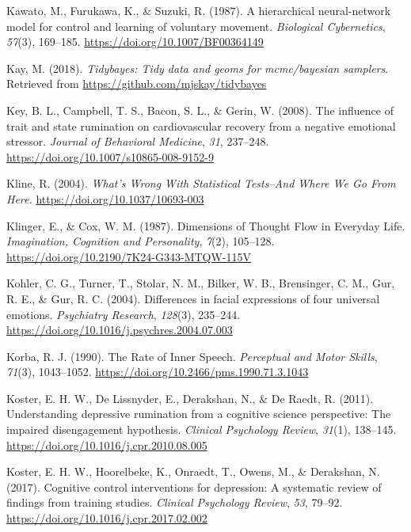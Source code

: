 \documentclass[a4paper,12pt,twoside,openright,oldfontcommands]{memoir}
\begin{document}
\leavevmode\hypertarget{ref-kawato_hierarchical_1987}{}%
Kawato, M., Furukawa, K., \& Suzuki, R. (1987). A hierarchical neural-network model for control and learning of voluntary movement. \emph{Biological Cybernetics}, \emph{57}(3), 169--185. \url{https://doi.org/10.1007/BF00364149}

\leavevmode\hypertarget{ref-R-tidybayes}{}%
Kay, M. (2018). \emph{Tidybayes: Tidy data and geoms for mcmc/bayesian samplers}. Retrieved from \url{https://github.com/mjskay/tidybayes}

\leavevmode\hypertarget{ref-Key2008}{}%
Key, B. L., Campbell, T. S., Bacon, S. L., \& Gerin, W. (2008). The influence of trait and state rumination on cardiovascular recovery from a negative emotional stressor. \emph{Journal of Behavioral Medicine}, \emph{31}, 237--248. \url{https://doi.org/10.1007/s10865-008-9152-9}

\leavevmode\hypertarget{ref-Kline2004}{}%
Kline, R. (2004). \emph{What's Wrong With Statistical Tests--And Where We Go From Here.} \url{https://doi.org/10.1037/10693-003}

\leavevmode\hypertarget{ref-klinger_dimensions_1987}{}%
Klinger, E., \& Cox, W. M. (1987). Dimensions of Thought Flow in Everyday Life. \emph{Imagination, Cognition and Personality}, \emph{7}(2), 105--128. \url{https://doi.org/10.2190/7K24-G343-MTQW-115V}

\leavevmode\hypertarget{ref-kohler_differences_2004}{}%
Kohler, C. G., Turner, T., Stolar, N. M., Bilker, W. B., Brensinger, C. M., Gur, R. E., \& Gur, R. C. (2004). Differences in facial expressions of four universal emotions. \emph{Psychiatry Research}, \emph{128}(3), 235--244. \url{https://doi.org/10.1016/j.psychres.2004.07.003}

\leavevmode\hypertarget{ref-korba_rate_1990}{}%
Korba, R. J. (1990). The Rate of Inner Speech. \emph{Perceptual and Motor Skills}, \emph{71}(3), 1043--1052. \url{https://doi.org/10.2466/pms.1990.71.3.1043}

\leavevmode\hypertarget{ref-Koster2011}{}%
Koster, E. H. W., De Lissnyder, E., Derakshan, N., \& De Raedt, R. (2011). Understanding depressive rumination from a cognitive science perspective: The impaired disengagement hypothesis. \emph{Clinical Psychology Review}, \emph{31}(1), 138--145. \url{https://doi.org/10.1016/j.cpr.2010.08.005}

\leavevmode\hypertarget{ref-koster_cognitive_2017}{}%
Koster, E. H. W., Hoorelbeke, K., Onraedt, T., Owens, M., \& Derakshan, N. (2017). Cognitive control interventions for depression: A systematic review of findings from training studies. \emph{Clinical Psychology Review}, \emph{53}, 79--92. \url{https://doi.org/10.1016/j.cpr.2017.02.002}
\end{document}

